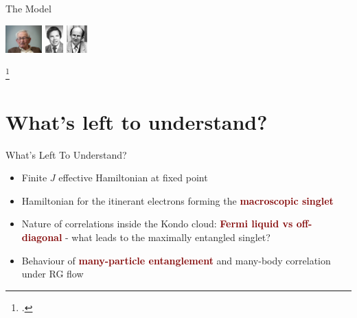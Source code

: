 \documentclass[aspectratio=169]{beamer}
\newcommand{\focus}[1]{\textcolor{maroon}{\textbf{#1}}}
\begin{document}
\begin{frame}[noframenumbering]{The Model}
{\begin{minipage}{0.3\textwidth}
	\vspace*{30pt}
	\includegraphics[height=30pt]{figures/pwanderson.jpg}
	\hspace*{\fill}
	\includegraphics[height=30pt]{figures/kgwilson.jpg}
	\hspace*{\fill}
	\includegraphics[height=30pt]{figures/nozieres.jpg}
\end{minipage}
\footcite{anderson1969exact,anderson1970,wilson1975,andreiKondoreview,andrei_kondo,wiegmann_kondoexact_1981,nozieres1974fermi}
}
\end{frame}

\section{What's left to understand?}
\begin{frame}[noframenumbering]{What's Left To Understand?}
  
\begin{itemize}[<+-|alert@+>]
	\item Finite \(J\) effective Hamiltonian at fixed point
	\vspace*{20pt}
	\item Hamiltonian for the itinerant electrons forming the \focus{macroscopic singlet}
	\vspace*{20pt}
	\item Nature of correlations inside the Kondo cloud: \focus{Fermi liquid vs off-diagonal} - what leads to the maximally entangled singlet?
	\vspace*{20pt}
	\item Behaviour of \focus{many-particle entanglement} and many-body correlation under RG flow
\end{itemize}

\end{frame}
\end{document}
